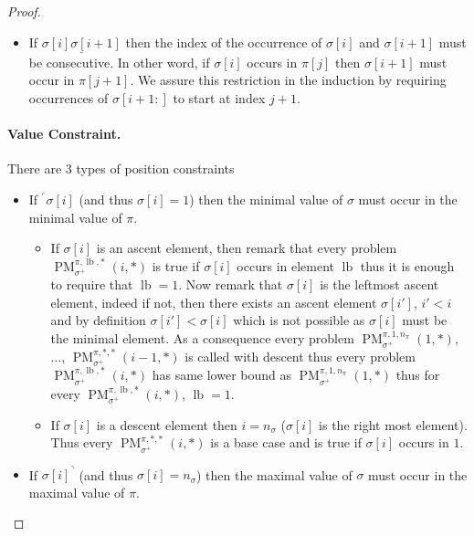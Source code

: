 \documentclass[a4paper]{llncs}
\newcommand{\ptext}{\pi}
\newcommand{\pmotif}{\sigma}
\newcommand{\pbmotif}{\pmotif^+}
\DeclareMathOperator{\PMa}{PM}
\newcommand{\PM}[6]{\PMa_{{#1}}^{{#2},{#3},{#4}}({#5},{#6})}
\DeclareMathOperator{\lb}{lb}
\begin{document}
\begin{proof}
\begin{itemize}
	\item If $\underline{\pmotif[i]\pmotif[i+1]}$ then the index of the occurrence of $\pmotif[i]$ and $\pmotif[i+1]$ must be consecutive. In other word, if $\pmotif[i]$ occurs in $\ptext[j]$ then $\pmotif[i+1]$ must occur in $\ptext[j+1]$. We assure this restriction in the induction by requiring occurrences of $\pmotif[i+1:]$ to start at index $j+1$.
\end{itemize}

\paragraph{Value Constraint.} There are 3 types of position constraints
\begin{itemize}
	\item If $^\ulcorner{\sigma[i]}$ (and thus $\sigma[i]=1$) then the minimal value of $\pmotif$ must occur in the minimal value of $\ptext$.
	\begin{itemize}

		\item If $\sigma[i]$ is an ascent element, then remark that 
		every problem 
		$\PM{\pbmotif}{\ptext}{\lb}{*}{i}{*}$ is true if $\sigma[i]$ occurs in element $\lb$ thus it is enough to require that $\lb=1$.
		Now remark that $\sigma[i]$ is the leftmost ascent element, indeed if not, then there exists an ascent element $\sigma[i']$, $i'<i$ and by definition $\sigma[i']<\sigma[i]$ which is not possible as $\sigma[i]$ must be the minimal element. As a consequence every problem $\PM{\pbmotif}{\ptext}{1}{n_{\pi}}{1}{*}$, $\dots$, $\PM{\pbmotif}{\ptext}{*}{*}{i-1}{*}$ is called with descent thus every problem 
		$\PM{\pbmotif}{\ptext}{\lb}{*}{i}{*}$ has same lower bound as $\PM{\pbmotif}{\ptext}{1}{n_{\ptext}}{1}{*}$ thus for every $\PM{\pbmotif}{\ptext}{\lb}{*}{i}{*}$, $\lb=1$.
					
		\item If $\sigma[i]$ is a descent element then $i=n_\pmotif$ ($\sigma[i]$ is the right most element). Thus every $\PM{\pbmotif}{\ptext}{*}{*}{i}{*}$ is a base case and is true if $\sigma[i]$ occurs in $1$.

	\end{itemize}




	\item If ${\pmotif[i]}^\urcorner$ (and thus $\sigma[i]=n_\pmotif$) then the maximal value of $\pmotif$ must occur in the maximal value of $\ptext$.
	\begin{itemize}


\end{itemize}
\end{itemize}
\end{proof}
\end{document}
